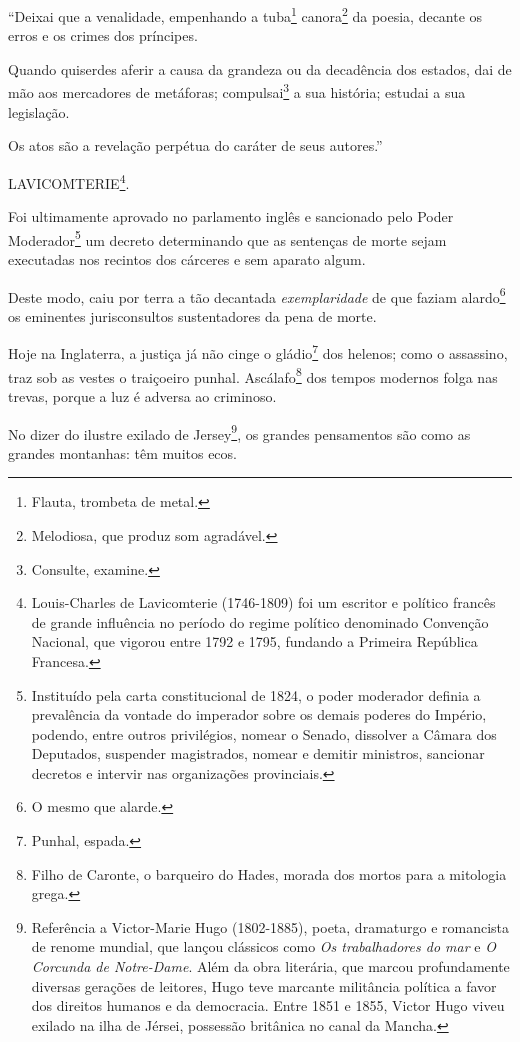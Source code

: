 ``Deixai que a venalidade, empenhando a tuba\footnote{Flauta, trombeta
  de metal.} canora\footnote{Melodiosa, que produz som agradável.} da
poesia, decante os erros e os crimes dos príncipes.

Quando quiserdes aferir a causa da grandeza ou da decadência dos
estados, dai de mão aos mercadores de metáforas; compulsai\footnote{
  Consulte, examine.} a sua história; estudai a sua legislação.

Os atos são a revelação perpétua do caráter de seus autores.''

LAVICOMTERIE\footnote{Louis-Charles de Lavicomterie (1746-1809) foi um
  escritor e político francês de grande influência no período do regime
  político denominado Convenção Nacional, que vigorou entre 1792 e 1795,
  fundando a Primeira República Francesa.}.

Foi ultimamente aprovado no parlamento inglês e sancionado pelo Poder
Moderador\footnote{Instituído pela carta constitucional de 1824, o
  poder moderador definia a prevalência da vontade do imperador sobre os
  demais poderes do Império, podendo, entre outros privilégios, nomear o
  Senado, dissolver a Câmara dos Deputados, suspender magistrados,
  nomear e demitir ministros, sancionar decretos e intervir nas
  organizações provinciais.} um decreto determinando que as sentenças de
morte sejam executadas nos recintos dos cárceres e sem aparato algum.

Deste modo, caiu por terra a tão decantada \emph{exemplaridade} de que
faziam alardo\footnote{O mesmo que alarde.} os eminentes
jurisconsultos sustentadores da pena de morte.

Hoje na Inglaterra, a justiça já não cinge o gládio\footnote{Punhal,
  espada.} dos helenos; como o assassino, traz sob as vestes o
traiçoeiro punhal. Ascálafo\footnote{Filho de Caronte, o barqueiro do
  Hades, morada dos mortos para a mitologia grega.} dos tempos modernos
folga nas trevas, porque a luz é adversa ao criminoso.

No dizer do ilustre exilado de Jersey\footnote{Referência a
  Victor-Marie Hugo (1802-1885), poeta, dramaturgo e romancista de
  renome mundial, que lançou clássicos como \emph{Os trabalhadores do
  mar} e \emph{O Corcunda de Notre-Dame}. Além da obra literária, que
  marcou profundamente diversas gerações de leitores, Hugo teve marcante
  militância política a favor dos direitos humanos e da democracia.
  Entre 1851 e 1855, Victor Hugo viveu exilado na ilha de Jérsei,
  possessão britânica no canal da Mancha.}, os grandes pensamentos são
como as grandes montanhas: têm muitos ecos.

